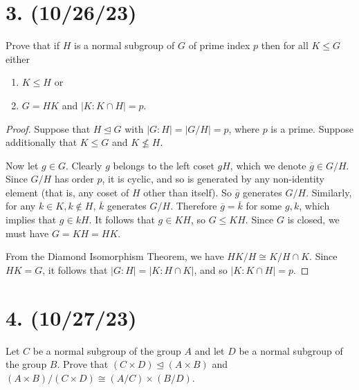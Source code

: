 \documentclass{article}
\begin{document}

\section*{3. (10/26/23)}

Prove that if $H$ is a normal subgroup of $G$ of prime index $p$ then for all $K \leq G$ either
\begin{enumerate}[label=(\roman*), itemsep=0em]
    \item $K \leq H$ or
    \item $G = HK$ and $|K : K \cap H| = p$. 
\end{enumerate}

\begin{proof}
    Suppose that $H \unlhd G$ with $|G:H| = |G/H| = p$, where $p$ is a prime. Suppose additionally that $K \leq G$ and $K \nleq H$.

    Now let $g \in G$. Clearly $g$ belongs to the left coset $gH$, which we denote $\overline{g} \in G/H$. Since $G/H$ has order $p$, it is cyclic, and so is generated by any non-identity element (that is, any coset of $H$ other than itself). So $\overline{g}$ generates $G/H$. Similarly, for any $k \in K, k \notin H$, $\overline{k}$ generates $G/H$. Therefore $\overline{g} = \overline{k}$ for some $g, k$, which implies that $g \in kH$. It follows that $g \in KH$, so $G \leq KH$. Since $G$ is closed, we must have $G = KH = HK$.

    From the Diamond Isomorphism Theorem, we have $HK / H \cong K / H \cap K$. Since $HK = G$, it follows that $|G : H| = |K : H \cap K|$, and so $|K : K \cap H| = p$.
\end{proof}

\section*{4. (10/27/23)}

Let $C$ be a normal subgroup of the group $A$ and let $D$ be a normal subgroup of the group $B$. Prove that $(C \times D) \unlhd (A \times B)$ and $(A \times B)/(C \times D) \cong (A / C) \times (B / D)$.
\end{document}
